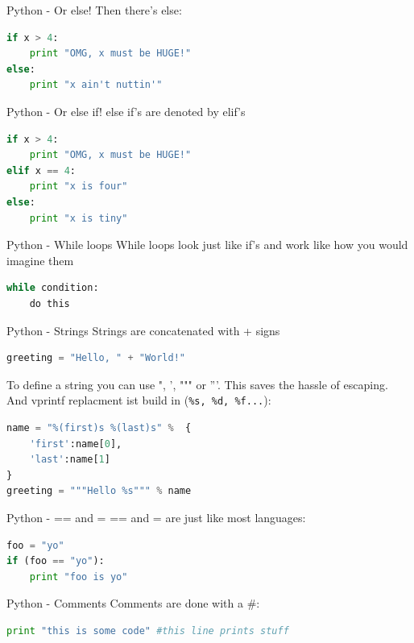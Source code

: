 \documentclass[fleqn,11pt,aspectratio=43]{beamer}
\begin{document}
\begin{frame}[fragile]{Python - Or else!}
Then there's else:
\begin{lstlisting}[language=python]
if x > 4:
    print "OMG, x must be HUGE!"
else:
    print "x ain't nuttin'"
\end{lstlisting}
\end{frame}

\begin{frame}[fragile]{Python - Or else if!}
else if's are denoted by elif's

\begin{lstlisting}[language=python]
if x > 4:
    print "OMG, x must be HUGE!"
elif x == 4:
    print "x is four"
else:
    print "x is tiny"
\end{lstlisting}
\end{frame}


\begin{frame}[fragile]{Python - While loops}
While loops look just like if's and work like how you would imagine them
\begin{lstlisting}[language=python]
while condition:
    do this
\end{lstlisting}
\end{frame}


\begin{frame}[fragile]{Python - Strings}
Strings are concatenated with + signs
\begin{lstlisting}[language=python]
greeting = "Hello, " + "World!"
\end{lstlisting}
To define a string you can use ", ', """ or '''. This saves the hassle of escaping.
And vprintf replacment ist build in ({\tt \%s, \%d, \%f...}):
\begin{lstlisting}[language=python]
name = "%(first)s %(last)s" %  {
    'first':name[0], 
    'last':name[1]
}
greeting = """Hello %s""" % name
\end{lstlisting}
\end{frame}

\begin{frame}[fragile]{Python - == and =}
== and = are just like most languages:
\begin{lstlisting}[language=python]
foo = "yo"
if (foo == "yo"):
    print "foo is yo"
\end{lstlisting}
\end{frame}


\begin{frame}[fragile]{Python - Comments}
Comments are done with a \#:
\begin{lstlisting}[language=python]
print "this is some code" #this line prints stuff
\end{lstlisting}
\end{frame}
\end{document}

